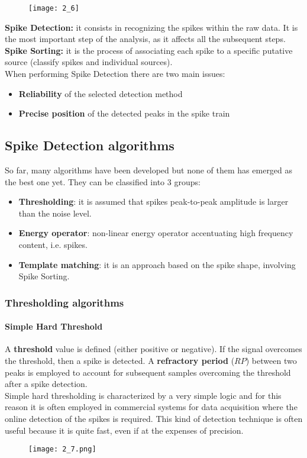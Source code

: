 \begin{figure}[H]
    \texttt{[image: 2\_6]}
    \centering
\end{figure}
\textbf{Spike Detection:} it consists in recognizing the spikes within the raw data. It is the most
important step of the analysis, as it affects all the subsequent steps.\\
\textbf{Spike Sorting:} it is the process of associating each spike to a specific putative source
(classify spikes and individual sources).\\
When performing Spike Detection there are two main issues:
\begin{itemize}
    \item \textbf{Reliability} of the selected detection method
    \item \textbf{Precise position} of the detected peaks in the spike train
\end{itemize}

\subsection{Spike Detection algorithms}
So far, many algorithms have been developed but none of them has emerged as the best one yet.
They can be classified into 3 groups:
\begin{itemize}
    \item \textbf{Thresholding}: it is assumed that spikes peak-to-peak amplitude is larger than the noise level.
    \item \textbf{Energy operator}: non-linear energy operator accentuating high frequency content, i.e. spikes.
    \item \textbf{Template matching}: it is an approach based on the spike shape, involving Spike Sorting.
\end{itemize}
\subsubsection{Thresholding algorithms}
\paragraph{Simple Hard Threshold}
A \textbf{threshold} value is defined (either positive or negative). If the signal overcomes the threshold,
then a spike is detected. A \textbf{refractory period} (\(RP\)) between two peaks is employed to account for
subsequent samples overcoming the threshold after a spike detection.\\
Simple hard thresholding is characterized by a very simple logic and for this reason it is often employed in
commercial systems for data acquisition where the online detection of the spikes is required. This kind of
detection technique is often useful because it is quite fast, even if at the expenses of precision.
\begin{figure}[H]
    \centering
    \texttt{[image: 2\_7.png]}
\end{figure}

